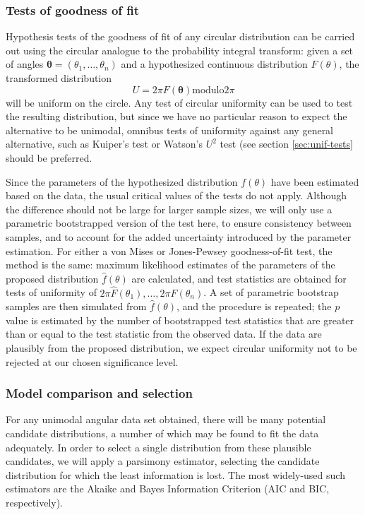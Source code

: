 \documentclass[../../ArchStats.tex]{subfiles}
\begin{document}

\subsubsection{Tests of goodness of fit}

Hypothesis tests of the goodness of fit of any circular distribution can be carried out using the circular analogue to the probability integral transform: given a set of angles $\mathbf{\theta} = (\theta_1, \dots, \theta_n)$ and a hypothesized continuous distribution $F(\theta)$, the transformed distribution
\[U = 2\pi F(\mathbf{\theta}) \text{modulo} 2\pi\]
will be uniform on the circle. Any test of circular uniformity can be used to test the resulting distribution, but since we have no particular reason to expect the alternative to be unimodal, omnibus tests of uniformity against any general alternative, such as Kuiper's test or Watson's $U^2$ test (see section \ref{sec:unif-tests} should be preferred.

Since the parameters of the hypothesized distribution $f(\theta)$ have been estimated based on the data, the usual critical values of the tests do not apply. Although the difference should not be large for larger sample sizes, we will only use a parametric bootstrapped version of the test here, to ensure consistency between samples, and to account for the added uncertainty introduced by the parameter estimation. For either a von Mises or Jones-Pewsey goodness-of-fit test, the method is the same: maximum likelihood estimates of the parameters of the proposed distribution $\hat{f}(\theta)$ are calculated, and test statistics are obtained for tests of uniformity of $2\pi \hat{F}(\theta_1), \dots, 2\pi \hat{F}(\theta_n)$. A set of parametric bootstrap samples are then simulated from $\hat{f}(\theta)$, and the procedure is repeated; the $p$ value is estimated by the number of bootstrapped test statistics that are greater than or equal to the test statistic from the observed data. If the data are plausibly from the proposed distribution, we expect circular uniformity not to be rejected at our chosen significance level.


\subsubsection{Model comparison and selection}

For any unimodal angular data set obtained, there will be many potential candidate distributions, a number of which may be found to fit the data adequately. In order to select a single distribution from these plausible candidates, we will apply a parsimony estimator, selecting the candidate distribution for which the least information is lost. The most widely-used such estimators are the Akaike and Bayes Information Criterion (AIC and BIC, respectively).
\end{document}
